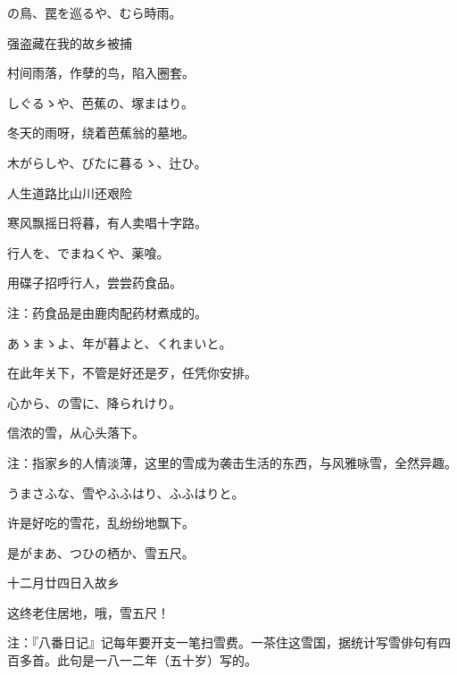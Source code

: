 \begin{haiku}
    {\FH {}の鳥、罠を巡るや、むら時雨。}

    {\FK 强盗藏在我的故乡被捕}

    {\FK 村间雨落，作孽的鸟，陷入圈套。}
\end{haiku}

\begin{haiku}
    {\FH しぐるゝや、芭蕉の、塚まはり。}

    {\FK 冬天的雨呀，绕着芭蕉翁的墓地。}
\end{haiku}

\begin{haiku}
    {\FH 木がらしや、びたに暮るゝ、辻ひ。}

    {\FK 人生道路比山川还艰险}

    {\FK 寒风飘摇日将暮，有人卖唱十字路。}
\end{haiku}

\begin{haiku}
    {\FH 行人を、でまねくや、薬喰。}

    {\FK 用碟子招呼行人，尝尝药食品。}

    {\FT 注：药食品是由鹿肉配药材煮成的。}
\end{haiku}

\begin{haiku}
    {\FH あゝまゝよ、年が暮よと、くれまいと。}

    {\FK 在此年关下，不管是好还是歹，任凭你安排。}
\end{haiku}

\begin{haiku}
    {\FH 心から、の雪に、降られけり。}

    {\FK 信浓的雪，从心头落下。}

    {\FT 注：指家乡的人情淡薄，这里的雪成为袭击生活的东西，与风雅咏雪，全然异趣。}
\end{haiku}

\begin{haiku}
    {\FH うまさふな、雪やふふはり、ふふはりと。}

    {\FK 许是好吃的雪花，乱纷纷地飘下。}
\end{haiku}

\begin{haiku}
    {\FH 是がまあ、つひの栖か、雪五尺。}

    {\FK 十二月廿四日入故乡}

    {\FK 这终老住居地，哦，雪五尺！}

    {\FT 注：『八番日记』记每年要开支一笔扫雪费。一茶住这雪国，据统计写雪俳句有四百多首。此句是一八一二年（五十岁）写的。}
\end{haiku}

